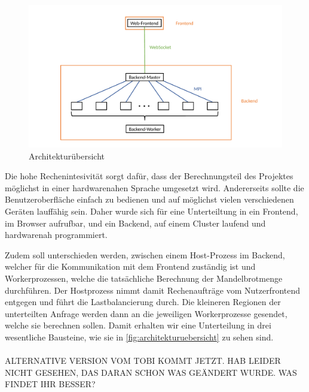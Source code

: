 \begin{figure}[t]
	\centering
	\includegraphics[width=0.98\linewidth]{img/Implementierung/Kommunikation.pdf}
	\caption{Architekturübersicht}
	\label{fig:architekturuebersicht}
\end{figure}

Die hohe Rechenintesivität sorgt dafür, dass der Berechnungsteil des Projektes möglichst in einer
hardwarenahen Sprache umgesetzt wird.
Andererseits sollte die Benutzeroberfläche einfach zu bedienen und auf möglichst vielen verschiedenen Geräten lauffähig sein.
Daher wurde sich für eine Unterteiltung in ein Frontend, im Browser aufrufbar, und ein Backend, auf einem Cluster
laufend und hardwarenah programmiert.

Zudem soll unterschieden werden, zwischen einem Host-Prozess im Backend, welcher für die Kommunikation mit dem
Frontend zuständig ist und Workerprozessen, welche die tatsächliche Berechnung der Mandelbrotmenge durchführen.
Der Hostprozess nimmt damit Rechenaufträge vom Nutzerfrontend entgegen und führt die Lastbalancierung durch.
Die kleineren Regionen der unterteilten Anfrage werden dann an die jeweiligen Workerprozesse gesendet, welche sie berechnen sollen.
Damit erhalten wir eine Unterteilung in drei wesentliche Bausteine, wie sie in \autoref{fig:architekturuebersicht} zu sehen sind.
\\ \\
ALTERNATIVE VERSION VOM TOBI KOMMT JETZT. HAB LEIDER NICHT GESEHEN, DAS DARAN SCHON WAS GEÄNDERT WURDE. WAS FINDET IHR BESSER?
\\ \\
